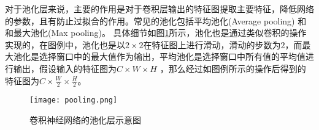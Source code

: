 对于池化层来说，主要的作用是对于卷积层输出的特征图提取主要特征，降低网络的参数，且有防止过拟合的作用。常见的池化包括平均池化(Average pooling) 和和最大池化(Max pooling)。 具体细节如图\ref{fig:pooling-example}所示，池化也是通过类似卷积的操作实现的，在图例中，池化也是以$2 \times 2$在特征图上进行滑动，滑动的步数为$2$，而最大池化是选择窗口中的最大值作为输出，平均池化是选择窗口中所有值的平均值进行输出，假设输入的特征图为$C \times W \times H$ ，那么经过如图例所示的操作后得到的特征图为$C \times \frac{W}{2} \times \frac{H}{2}$。
\begin{figure}[htpb]
	\centering
	\texttt{[image: pooling.png]}
    \caption{卷积神经网络的池化层示意图}
	\vspace*{-3.5mm}
	\label{fig:pooling-example}
\end{figure}

